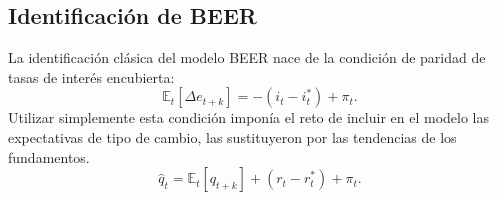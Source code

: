 \documentclass[12pt,letterpaper]{article}
\begin{document}
\subsection*{Identificación de BEER}

La identificación clásica del modelo BEER nace de la condición de paridad de tasas de interés encubierta:
\begin{equation}
\mathbb{E}_t[\Delta e_{t+k}]=-(i_t-i_t^*)+\pi_t.
\end{equation}
Utilizar simplemente esta condición imponía el reto de incluir en el modelo las expectativas de tipo de cambio, \cite{clark1999exchange} las sustituyeron por las tendencias de los fundamentos.
\begin{equation}
\hat{q}_t=\mathbb{E}_t[q_{t+k}]+(r_t-r_t^*)+\pi_t.
\end{equation}

\end{document}
